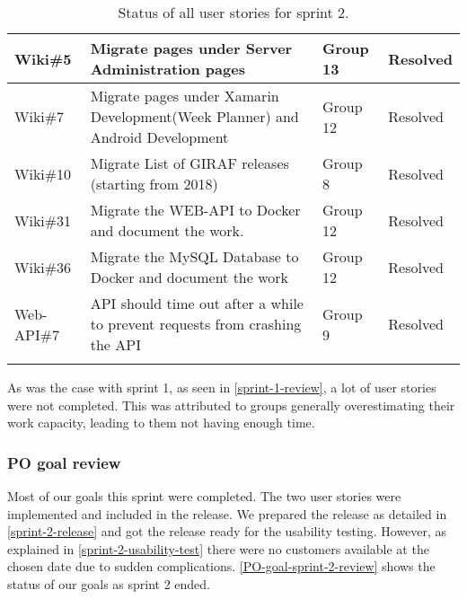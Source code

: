 \begin{longtable}{|p{2.8cm}|p{7cm}|p{1.5cm}|p{1.8cm}|}
    Wiki\#5         & Migrate pages under Server Administration pages                                                                                                                                          & Group 13        & Resolved    \\ \hline
    Wiki\#7         & Migrate pages under Xamarin Development(Week Planner) and Android Development                                                                                                            & Group 12        & Resolved    \\ \hline
    Wiki\#10        & Migrate List of GIRAF releases (starting from 2018)                                                                                                                                      & Group 8         & Resolved    \\ \hline
    Wiki\#31        & Migrate the WEB-API to Docker and document the work.                                                                                                                                     & Group 12        & Resolved    \\ \hline
    Wiki\#36        & Migrate the MySQL Database to Docker and document the work                                                                                                                               & Group 12        & Resolved    \\ \hline
    Web-API\#7      & API should time out after a while to prevent requests from crashing the API                                                                                                              & Group 9         & Resolved    \\ \hline
    \caption{Status of all user stories for sprint 2.}\label{sprint-2-review-table}
\end{longtable}
\noindent
As was the case with sprint 1, as seen in \autoref{sprint-1-review}, a lot of user stories were not completed.
This was attributed to groups generally overestimating their work capacity, leading to them not having enough time.

\subsubsection{PO goal review}
Most of our goals this sprint were completed.
The two user stories were implemented and included in the release. 
We prepared the release as detailed in \autoref{sprint-2-release} and got the release ready for the usability testing.
However, as explained in \autoref{sprint-2-usability-test} there were no customers available at the chosen date due to sudden complications.
\autoref{PO-goal-sprint-2-review} shows the status of our goals as sprint 2 ended.


